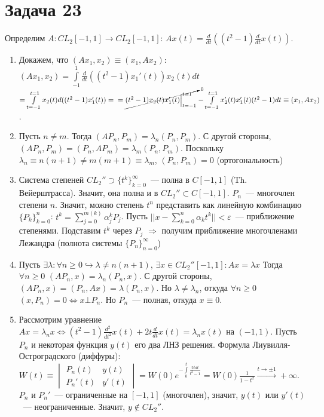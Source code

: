 \documentclass[a4paper]{article}
\def\eps{\varepsilon}
\begin{document}
\section*{Задача 23}
Определим $A\colon CL_2[-1,1]\to CL_2[-1,1]$: $Ax(t)=\frac{d}{dt}((t^2-1)\frac{d}{dt}x(t))$.
\begin{enumerate}
	\item  Докажем, что $(Ax_1,x_2)\equiv (x_1, Ax_2)$: $(Ax_1,x_2)=\int\limits_{-1}^1 \frac{d}{dt}((t^2-1)x_1'(t))x_2(t)dt$
	$=\int\limits_{t=-1}^{t=1}x_2(t)d((t^2-1)x_1'(t))=\\=\cancelto{0}{(t^2-1)x_2(t)x_1'(t)\Big|_{t=-1}^{t=1}}-\int\limits_{t=-1}^{t=1}x_2'(t)x_1'(t)(t^2-1)dt\equiv (x_1,Ax_2)$.
	\item Пусть $n\neq m$. Тогда $(AP_n,P_m)=\lambda_n (P_n,P_m)$. С другой стороны, $(AP_n,P_m)=(P_n,AP_m)=\lambda_m (P_n, P_m)$. Поскольку $\lambda_n\equiv n(n+1)\neq m(m+1)\equiv \lambda_m$, $(P_n,P_m)=0$ (ортогональность)
	\item Система степеней $CL_2''\supset \{t^k\}_{k=0}^{\infty}$~--- полна в $C[-1,1]$ (Th. Вейерштрасса). Значит, она полна и в $CL_2''\subset C[-1,1]$. $P_n$~--- многочлен степени $n$. Значит, можно степень $t^n$ представить как линейную комбинацию $\{P_k\}_{k=0}^n$: $t^k=\sum\limits_{j=0}^{m(k)} \alpha^k_j P_j$. Пусть $||x-\sum\limits_{k=0}^n \alpha_k t^k||<\eps$~--- приближение степенями. Подставим $t^k$ через $P_j$ $\Rightarrow$ получим приближение многочленами Лежандра (полнота системы $\{P_n\}_{n=0}^\infty$)
	\item Пусть $\exists \lambda\colon \forall n\geqslant 0 \hookrightarrow\lambda\neq n(n+1)$, $\exists x\in CL_2''[-1,1]\colon Ax=\lambda x$ Тогда $\forall n\geqslant 0$ $(AP_n,x)=\lambda_n (P_n,x)$. С другой стороны, $(AP_n,x)=(P_n,Ax)=\lambda(P_n,x)$. Но $\lambda\neq \lambda_n$, откуда $\forall n\geqslant 0$ $(x, P_n)=0\Leftrightarrow x\bot P_n$. Но $P_n$~--- полная, откуда $x\equiv 0$.
	\item Рассмотрим уравнение $Ax=\lambda_nx \Leftrightarrow  (t^2-1)\frac{d^2}{dt^2}x(t)+2t\frac{d}{dt}x(t)=\lambda_n x(t)$ на $(-1,1)$. Пусть $P_n$ и некоторая функция $y(t)$ его два ЛНЗ решения. Формула Лиувилля-Остроградского (диффуры): $W(t)\equiv \begin{vmatrix}
	P_n(t) & y(t)\\
	P_n'(t) & y'(t)
  	\end{vmatrix}
  	=W(0)e^{-\int\limits_0^{t}\frac{2tdt}{t^2-1}}=W(0)\frac{1}{1-t^2}\overset{t\to \pm 1}{\rightarrow}+\infty$. $P_n$ и $P_n'$~--- ограниченные на $[-1,1]$ (многочлен), значит, $y(t)$ или $y'(t)$~--- неограниченные. Значит, $y\notin CL_2''$.
\end{enumerate}
\end{document}

